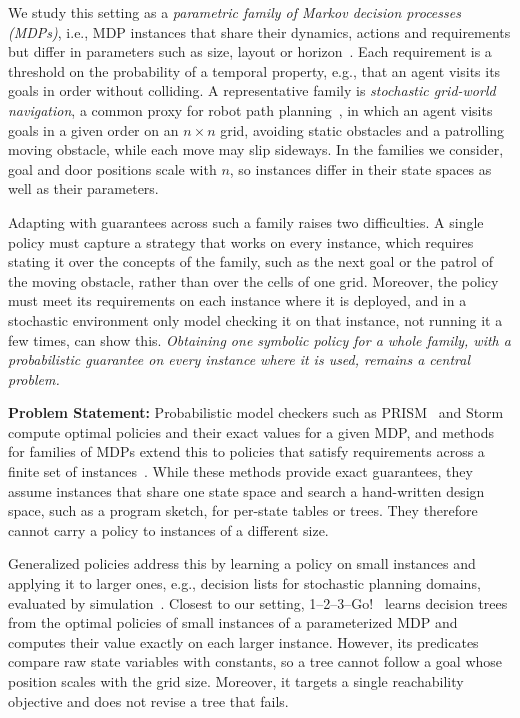 We study this setting as a \textit{parametric family of Markov decision processes (MDPs)}, i.e., MDP instances that share their dynamics, actions and requirements but differ in parameters such as size, layout or horizon~\cite{TODO-parameterized-MDPs-1-2-3-Go}.
Each requirement is a threshold on the probability of a temporal property, e.g., that an agent visits its goals in order without colliding.
A representative family is \textit{stochastic grid-world navigation}, a common proxy for robot path planning~\cite{TODO-gridworld-as-proxy-for-navigation}, in which an agent visits goals in a given order on an $n \times n$ grid, avoiding static obstacles and a patrolling moving obstacle, while each move may slip sideways.
In the families we consider, goal and door positions scale with $n$, so instances differ in their state spaces as well as their parameters.

Adapting with guarantees across such a family raises two difficulties.
A single policy must capture a strategy that works on every instance, which requires stating it over the concepts of the family, such as the next goal or the patrol of the moving obstacle, rather than over the cells of one grid.
Moreover, the policy must meet its requirements on each instance where it is deployed, and in a stochastic environment only model checking it on that instance, not running it a few times, can show this.
\textit{Obtaining one symbolic policy for a whole family, with a probabilistic guarantee on every instance where it is used, remains a central problem.}

\textbf{Problem Statement:}
Probabilistic model checkers such as PRISM~\cite{TODO-PRISM} and Storm~\cite{TODO-Storm} compute optimal policies and their exact values for a given MDP, and methods for families of MDPs extend this to policies that satisfy requirements across a finite set of instances~\cite{TODO-Policies-Grow-on-Trees,TODO-SMPMC,TODO-PAYNT}.
While these methods provide exact guarantees, they assume instances that share one state space and search a hand-written design space, such as a program sketch, for per-state tables or trees.
They therefore cannot carry a policy to instances of a different size.

Generalized policies address this by learning a policy on small instances and applying it to larger ones, e.g., decision lists for stochastic planning domains, evaluated by simulation~\cite{TODO-Fern-Yoon-Givan-JAIR06}.
Closest to our setting, 1--2--3--Go!~\cite{TODO-1-2-3-Go-VMCAI25} learns decision trees from the optimal policies of small instances of a parameterized MDP and computes their value exactly on each larger instance.
However, its predicates compare raw state variables with constants, so a tree cannot follow a goal whose position scales with the grid size.
Moreover, it targets a single reachability objective and does not revise a tree that fails.

